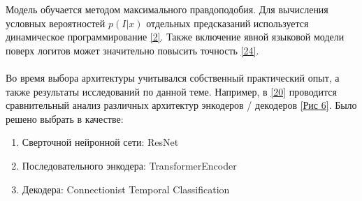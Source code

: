Модель обучается методом максимального правдоподобия. Для вычисления условных вероятностей $p(I|x)$ отдельных предсказаний используется динамическое программирование \hyperlink{cite.Gra06}{[2]}. Также включение явной языковой модели поверх логитов может значительно повысить точность \hyperlink{cite.Fuj17}{[24]}.
\paragraph{}
Во время выбора архитектуры учитывался собственный практический опыт, а также результаты исследований по данной теме. Например, в \hyperlink{cite.Her21}{[20]} проводится сравнительный анализ различных архитектур энкодеров / декодеров \hyperlink{image6}{[Рис 6]}. Было решено выбрать в качестве:
\begin{enumerate}
\item Сверточной нейронной сети: ResNet
\item Последовательного энкодера: TransformerEncoder
\item Декодера: Connectionist Temporal Classification
\end{enumerate}

\newpage